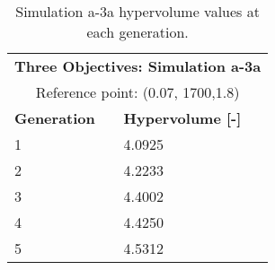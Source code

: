 \begin{table}[htbp!]
    \centering
    \onehalfspacing
    \caption{Simulation a-3a hypervolume values at each generation.}
	\label{tab:a3a-hypervolume}
    \footnotesize
    \begin{tabular}{ll}
    \hline 
    \multicolumn{2}{c}{\textbf{Three Objectives: Simulation a-3a}} \\
    \multicolumn{2}{c}{Reference point: (0.07, 1700,1.8)} \\
    \hline 
    \textbf{Generation} & \textbf{Hypervolume [-]} \\
    \hline
    1 & 4.0925 \\
    2 & 4.2233 \\
    3 & 4.4002 \\
    4 & 4.4250 \\
    5 & 4.5312 \\
    \hline
    \end{tabular}
\end{table}

